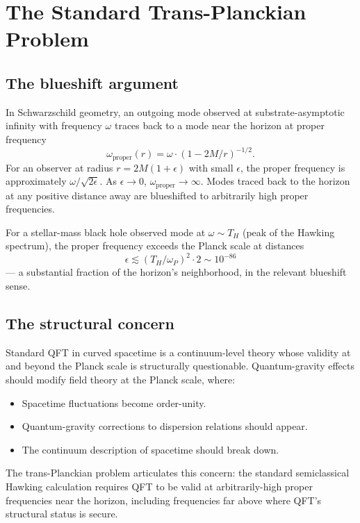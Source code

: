 \documentclass[11pt,a4paper]{article}
\begin{document}
\section{The Standard Trans-Planckian Problem}

\subsection{The blueshift argument}

In Schwarzschild geometry, an outgoing mode observed at substrate-asymptotic infinity with frequency $\omega$ traces back to a mode near the horizon at proper frequency
\[
\omega_\mathrm{proper}(r) = \omega \cdot (1 - 2M/r)^{-1/2}.
\]
For an observer at radius $r = 2M(1+\epsilon)$ with small $\epsilon$, the proper frequency is approximately $\omega/\sqrt{2\epsilon}$. As $\epsilon \to 0$, $\omega_\mathrm{proper} \to \infty$. Modes traced back to the horizon at any positive distance away are blueshifted to arbitrarily high proper frequencies.

For a stellar-mass black hole observed mode at $\omega \sim T_H$ (peak of the Hawking spectrum), the proper frequency exceeds the Planck scale at distances
\[
\epsilon \lesssim (T_H/\omega_P)^{2} \cdot 2 \sim 10^{-86}
\]
--- a substantial fraction of the horizon's neighborhood, in the relevant blueshift sense.

\subsection{The structural concern}

Standard QFT in curved spacetime is a continuum-level theory whose validity at and beyond the Planck scale is structurally questionable. Quantum-gravity effects should modify field theory at the Planck scale, where:
\begin{itemize}[noitemsep]
\item Spacetime fluctuations become order-unity.
\item Quantum-gravity corrections to dispersion relations should appear.
\item The continuum description of spacetime should break down.
\end{itemize}

The trans-Planckian problem articulates this concern: the standard semiclassical Hawking calculation requires QFT to be valid at arbitrarily-high proper frequencies near the horizon, including frequencies far above where QFT's structural status is secure.
\end{document}
